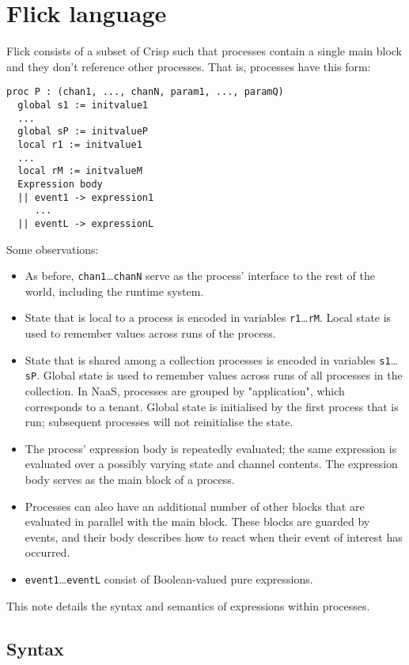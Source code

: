 \documentclass{article}
\begin{document}
\section{Flick language}
Flick consists of a subset of Crisp such that processes contain a single main block
and they don't reference other processes.
That is, processes have this form:
\begin{verbatim}
proc P : (chan1, ..., chanN, param1, ..., paramQ)
  global s1 := initvalue1
  ...
  global sP := initvalueP
  local r1 := initvalue1
  ...
  local rM := initvalueM
  Expression body
  || event1 -> expression1
     ...
  || eventL -> expressionL
\end{verbatim}
Some observations:
\begin{itemize}
  \item As before, \verb+chan1+\ldots\verb+chanN+ serve as the process' interface to the
rest of the world, including the runtime system.
\item State that is local to a process is encoded in variables
\verb+r1+\ldots\verb+rM+. Local state is used to remember values across runs of
the process.
\item State that is shared among a collection processes is encoded in variables
\verb+s1+\ldots\verb+sP+. Global state is used to remember values across runs of
all processes in the collection. In NaaS, processes are grouped by
"application", which corresponds to a tenant. Global state is initialised by the
first process that is run; subsequent processes will not reinitialise the state.
\item The process' expression body is repeatedly evaluated; the same expression is
evaluated over a possibly varying state and channel contents. The expression
body serves as the main block of a process.
\item Processes can also have an additional number of other blocks that are
  evaluated in parallel with the main block. These blocks are guarded by events,
  and their body describes how to react when their event of interest has occurred.
\item \verb+event1+\ldots\verb+eventL+ consist of Boolean-valued pure expressions.
\end{itemize}

This note details the syntax and semantics of expressions within processes.

\subsection{Syntax}
\newcommand{\syntaxcat}[1]{\ensuremath{\langle\text{\textit{#1}}\rangle}}
\end{document}
